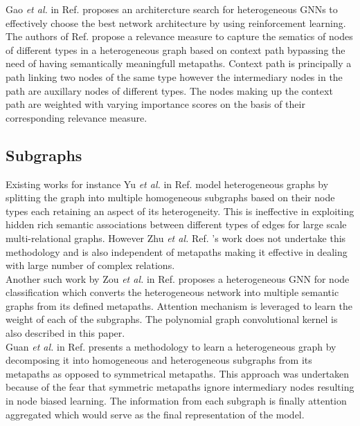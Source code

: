 \documentclass{report} %
\begin{document}
Gao \textit{et al.} in Ref. \cite{HGNNAS-2021} proposes an architercture search for heterogeneous \ac{GNN}s to effectively choose the best network architecture by using 
reinforcement learning. 
The authors of Ref. \cite{HGNNRM-2023} propose a relevance measure to capture the sematics of nodes of different types in a heterogeneous graph based on context path 
bypassing the need of having semantically meaningfull metapaths. Context path is principally a path linking two nodes of the same type however the intermediary nodes in the 
path are auxillary nodes of different types. The nodes making up the context path are weighted with varying importance scores on the basis of their corresponding relevance measure.

\subsection{Subgraphs}\label{subsec:HGNN Subgraphs}
Existing works for instance Yu \textit{et al.} in Ref. \cite{PR-HGNN-2024} model heterogeneous graphs by splitting the graph into multiple 
homogeneous subgraphs based on their node types each retaining an aspect of its heterogeneity.
This is ineffective in exploiting hidden rich semantic associations between different types of edges for large scale multi-relational graphs.
However Zhu \textit{et al.} Ref. \cite{RSHGNN-2019}'s work does not undertake this methodology and is also independent of metapaths making it effective 
in dealing with large number of complex relations.\\
Another such work by Zou \textit{et al.} in Ref. \cite{HNNC-2023} proposes a heterogeneous \ac{GNN} for node classification which converts the 
heterogeneous network into multiple semantic graphs from its defined metapaths. Attention mechanism is leveraged to learn the weight of each of the subgraphs. 
The polynomial graph convolutional kernel is also described in this paper.\\ 
Guan \textit{et al.} in Ref. \cite{HGNNSG-2023} presents a methodology to learn a heterogeneous graph by decomposing it into homogeneous and heterogeneous subgraphs from its metapaths 
as opposed to symmetrical metapaths. This approach was undertaken because of the fear that symmetric metapaths ignore intermediary nodes resulting in node biased learning. 
The information from each subgraph is finally attention aggregated which would serve as the final representation of the model.
\end{document}
